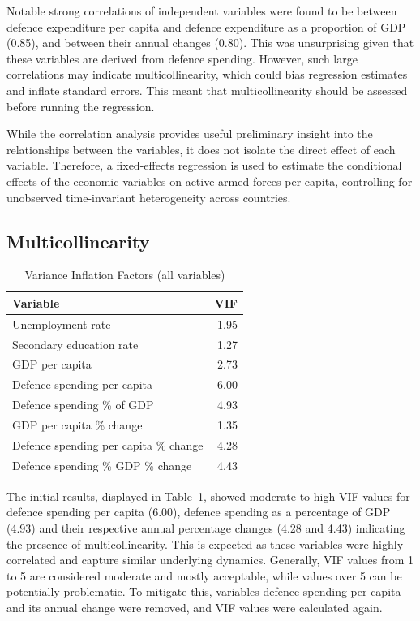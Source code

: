Notable strong correlations of independent variables were found to be between defence expenditure per capita and 
defence expenditure as a proportion of GDP (0.85), and between their annual changes (0.80). 
This was unsurprising given that these variables are derived from defence spending. 
However, such large correlations may indicate multicollinearity, which could 
bias regression estimates and inflate standard errors. This meant that multicollinearity should be 
assessed before running the regression.

While the correlation analysis provides useful preliminary insight into the relationships between 
the variables, it does not isolate the direct effect of each variable. Therefore, a 
fixed-effects regression is used to estimate the conditional effects of the economic variables 
on active armed forces per capita, controlling for unobserved time-invariant heterogeneity 
across countries.

\subsection{Multicollinearity}

\begin{table}[ht]
\caption{Variance Inflation Factors (all variables)}
\small
\centering
\begin{tabularx}{\textwidth}{l r}
\toprule
\textbf{Variable} & \textbf{VIF} \\
\midrule
Unemployment rate & 1.95 \\
Secondary education rate & 1.27 \\
GDP per capita & 2.73 \\
Defence spending per capita & 6.00 \\
Defence spending \% of GDP & 4.93 \\
GDP per capita \% change & 1.35 \\
Defence spending per capita \% change & 4.28 \\
Defence spending \% GDP \% change & 4.43 \\
\bottomrule
\end{tabularx}
\label{tab:multicollinearity_full}
\end{table}

The initial results, displayed in Table~\ref{tab:multicollinearity_full}, showed moderate to high VIF values for defence spending per capita (6.00), 
defence spending as a percentage of GDP (4.93) and their respective annual percentage changes (4.28 and 4.43)
indicating the presence of multicollinearity. This is expected as these variables were highly correlated 
and capture similar underlying dynamics.
Generally, VIF values from 1 to 5 are considered 
moderate and mostly acceptable, while values over 5 can be potentially problematic. To mitigate 
this, variables defence spending per capita and its annual change were removed, and VIF values 
were calculated again.

